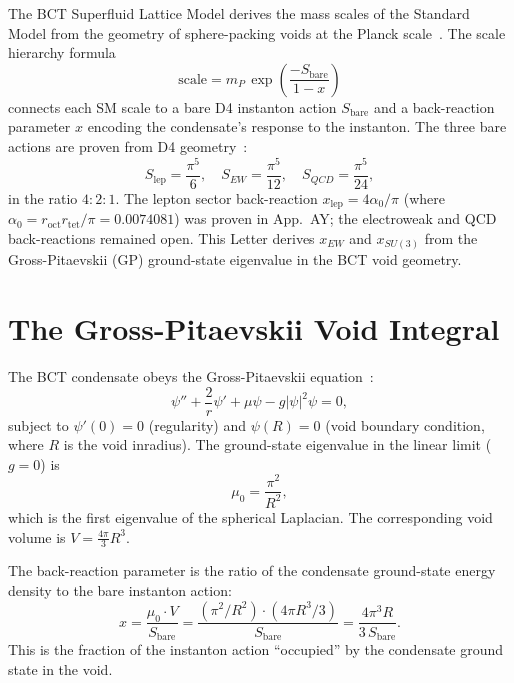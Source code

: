 \documentclass[aps,prl,twocolumn,showpacs,preprintnumbers]{revtex4-2}
\newcommand{\roct}{r_{\mathrm{oct}}}
\newcommand{\rtet}{r_{\mathrm{tet}}}
\newcommand{\azero}{\alpha_0}
\newcommand{\mP}{m_P}
\begin{document}
The BCT Superfluid Lattice Model derives the mass scales of the
Standard Model from the geometry of sphere-packing voids at the
Planck scale~\cite{letter1}. The scale hierarchy formula
\begin{equation}
  \text{scale} = \mP\,\exp\!\left(\frac{-S_{\mathrm{bare}}}{1-x}\right)
  \label{eq:hierarchy}
\end{equation}
connects each SM scale to a bare D4 instanton action $S_{\mathrm{bare}}$
and a back-reaction parameter $x$ encoding the condensate's response to
the instanton. The three bare actions are proven from D4 geometry~\cite{appAY}:
\begin{equation}
  S_{\mathrm{lep}} = \frac{\pi^5}{6}, \quad
  S_{EW} = \frac{\pi^5}{12}, \quad
  S_{QCD} = \frac{\pi^5}{24},
  \label{eq:actions}
\end{equation}
in the ratio $4:2:1$. The lepton sector back-reaction $x_{\mathrm{lep}} =
4\azero/\pi$ (where $\azero = \roct\rtet/\pi = 0.0074081$) was proven
in App.~AY; the electroweak and QCD back-reactions remained open.
This Letter derives $x_{EW}$ and $x_{SU(3)}$ from the
Gross-Pitaevskii (GP) ground-state eigenvalue in the BCT void geometry.

\section{The Gross-Pitaevskii Void Integral}

The BCT condensate obeys the Gross-Pitaevskii equation~\cite{letter27}:
\begin{equation}
  \psi'' + \frac{2}{r}\psi' + \mu\psi - g|\psi|^2\psi = 0,
  \label{eq:GP}
\end{equation}
subject to $\psi'(0)=0$ (regularity) and $\psi(R)=0$ (void boundary
condition, where $R$ is the void inradius). The ground-state eigenvalue
in the linear limit ($g=0$) is
\begin{equation}
  \mu_0 = \frac{\pi^2}{R^2},
\end{equation}
which is the first eigenvalue of the spherical Laplacian. The
corresponding void volume is $V = \frac{4\pi}{3}R^3$.

The back-reaction parameter is the ratio of the condensate
ground-state energy density to the bare instanton action:
\begin{equation}
  x = \frac{\mu_0 \cdot V}{S_{\mathrm{bare}}}
  = \frac{(\pi^2/R^2) \cdot (4\pi R^3/3)}{S_{\mathrm{bare}}}
  = \frac{4\pi^3 R}{3\,S_{\mathrm{bare}}}.
  \label{eq:x_formula}
\end{equation}
This is the fraction of the instanton action ``occupied'' by the
condensate ground state in the void.
\end{document}
